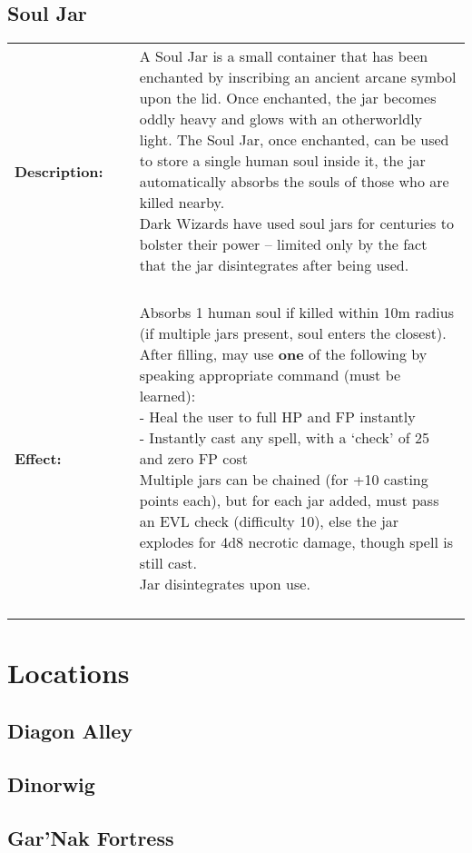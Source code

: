 \documentclass[oneside]{book}
\begin{document}
\subsection{Soul Jar}
\begin{longtable}{p{} p{} p{} }

\bf Description: & ~ &\parbox[t]{\q cm}{A Soul Jar is a small container that has been enchanted by inscribing an ancient arcane symbol upon the lid. Once enchanted, the jar becomes oddly heavy and glows with an otherworldly light. The Soul Jar, once enchanted, can be used to store a single human soul inside it, the jar automatically absorbs the souls of those who are killed nearby.   \\ Dark Wizards have used soul jars for centuries to bolster their power -- limited only by the fact that the jar disintegrates after being used. 
 \\~  } 
\\
\bf Effect:	& ~ & \parbox[t]{\q cm}{Absorbs 1 human soul if killed within 10m radius (if multiple jars present, soul enters the closest). After filling, may use {\bf one} of the following by speaking appropriate command (must be learned): \\ - Heal the user to full HP and FP instantly \\ - Instantly cast any spell, with a `check' of 25 and zero FP cost\\ Multiple jars can be chained (for +10 casting points each), but for each jar added, must pass an EVL check (difficulty 10), else the jar explodes for 4d8 necrotic damage, though spell is still cast. \\ Jar disintegrates upon use. \\~  } 
\end{longtable}


\section{Locations}
\subsection{Diagon Alley}
\subsection{Dinorwig}
\subsection{Gar'Nak Fortress}
\end{document}

